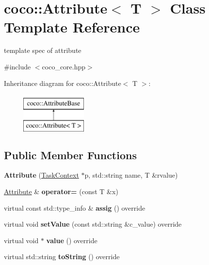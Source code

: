\hypertarget{classcoco_1_1_attribute}{}\section{coco\+:\+:Attribute$<$ T $>$ Class Template Reference}
\label{classcoco_1_1_attribute}


template spec of attribute  




{\ttfamily \#include $<$coco\+\_\+core.\+hpp$>$}

Inheritance diagram for coco\+:\+:Attribute$<$ T $>$\+:\begin{figure}[H]
\begin{center}
\leavevmode
\includegraphics[height=2.000000cm]{classcoco_1_1_attribute}
\end{center}
\end{figure}
\subsection*{Public Member Functions}
\begin{DoxyCompactItemize}
\item 
\hypertarget{classcoco_1_1_attribute_affcacf8fe8cbb263d456b6ebcb11ce3f}{}{\bfseries Attribute} (\hyperlink{classcoco_1_1_task_context}{Task\+Context} $\ast$p, std\+::string name, T \&rvalue)\label{classcoco_1_1_attribute_affcacf8fe8cbb263d456b6ebcb11ce3f}

\item 
\hypertarget{classcoco_1_1_attribute_a3593a7754010b3525e7ee2b457728d44}{}\hyperlink{classcoco_1_1_attribute}{Attribute} \& {\bfseries operator=} (const T \&x)\label{classcoco_1_1_attribute_a3593a7754010b3525e7ee2b457728d44}

\item 
\hypertarget{classcoco_1_1_attribute_a5e93340edc07fbcf413cbc3b61045e27}{}virtual const std\+::type\+\_\+info \& {\bfseries assig} () override\label{classcoco_1_1_attribute_a5e93340edc07fbcf413cbc3b61045e27}

\item 
\hypertarget{classcoco_1_1_attribute_ad170afa18295d7b00c1d2e8b9561a7b8}{}virtual void {\bfseries set\+Value} (const std\+::string \&c\+\_\+value) override\label{classcoco_1_1_attribute_ad170afa18295d7b00c1d2e8b9561a7b8}

\item 
\hypertarget{classcoco_1_1_attribute_aad989eaf82993b857ccde4f2226f1c07}{}virtual void $\ast$ {\bfseries value} () override\label{classcoco_1_1_attribute_aad989eaf82993b857ccde4f2226f1c07}

\item 
\hypertarget{classcoco_1_1_attribute_a1c51ca833bf8b35d3faed63fb9209958}{}virtual std\+::string {\bfseries to\+String} () override\label{classcoco_1_1_attribute_a1c51ca833bf8b35d3faed63fb9209958}

\end{DoxyCompactItemize}
